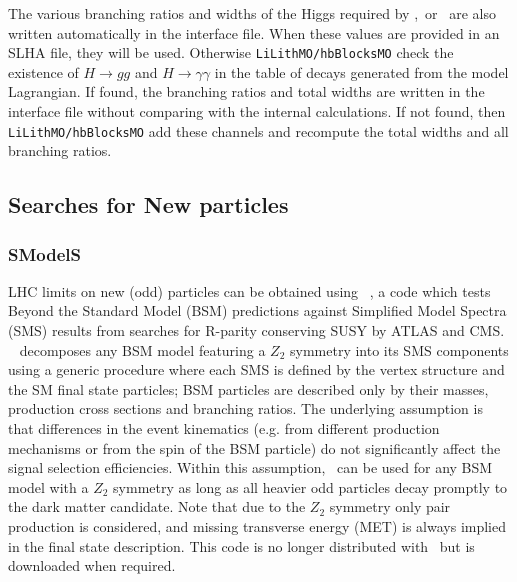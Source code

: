 \documentclass[12pt,a4paper]{article}
\begin{document}
The various branching ratios and widths of the Higgs required by   \HB,\HS\ or  \lilith\ are also written automatically in the interface file. When these 
values  are provided in an SLHA file, they will be used. Otherwise {\tt LiLithMO/hbBlocksMO}  check  the existence
of $H\rightarrow gg$  and $H\rightarrow \gamma\gamma$  in the table of decays generated from the model Lagrangian. If found, the branching ratios and total widths are written in the  interface file without comparing  with the internal calculations. If not found, then {\tt LiLithMO/hbBlocksMO} add these channels and  recompute the total widths and all branching ratios.




\subsection{Searches for New particles}

\subsubsection{SModelS}
LHC limits on new (odd) particles can be obtained using \smodels~\cite{Kraml:2013mwa,Kraml:2014sna}, 
a code which tests Beyond the Standard Model (BSM) predictions against Simplified Model Spectra (SMS) results from searches 
for R-parity conserving SUSY by ATLAS and CMS.
\smodels~ decomposes any BSM model featuring a ${Z}_2$ symmetry into its SMS components 
using a generic procedure where each SMS is defined by the vertex structure and the SM final state particles; BSM particles are described only by their masses, production cross sections and branching ratios. 
The underlying assumption is that differences in the event kinematics (e.g. from different production mechanisms or from the spin of the BSM particle) do not significantly affect the signal selection efficiencies. 
Within this assumption, \smodels\ can be used for any BSM model with a ${Z}_2$ symmetry as long as all heavier odd particles decay promptly to the dark matter candidate. Note that due to the ${Z}_2$ symmetry only pair production is considered, and missing transverse energy (MET) is always implied in the final state description.
This code is no longer distributed with \micro\ but is downloaded when required. 
\end{document}
